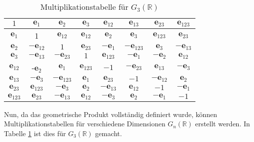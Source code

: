 \begin{table}
    \label{tab:multip}
    \begin{center}
    \begin{tabular}{ |c|ccc|ccc|c| } 
     \hline
     $1$ & $\textbf{e}_1$ & $\textbf{e}_2$ &$\textbf{e}_3$ & $\textbf{e}_{12}$ & $\textbf{e}_{13}$ & $\textbf{e}_{23}$ & $\textbf{e}_{123}$\\
     \hline
     $\textbf{e}_1$ & 1 & $\textbf{e}_{12}$ & $\textbf{e}_{12}$ & $\textbf{e}_2$ & $\textbf{e}_3$ & $\textbf{e}_{123}$ & $\textbf{e}_{23}$\\
     $\textbf{e}_2$ & $-\textbf{e}_{12}$ & $1$ & $\textbf{e}_{23}$ & $-\textbf{e}_1$ & $-\textbf{e}_{123}$ & $\textbf{e}_3$ & $-\textbf{e}_{13}$\\
     $\textbf{e}_3$ & $-\textbf{e}_{13}$ & $-\textbf{e}_{23}$ & $1$ & $\textbf{e}_{123}$ & $-\textbf{e}_1$ & $-\textbf{e}_2$ & $\textbf{e}_{12}$\\
     \hline
     $\textbf{e}_{12}$ & -$\textbf{e}_2$ & $\textbf{e}_1$& $\textbf{e}_{123}$ & $-1$ & $-\textbf{e}_{23}$ & $\textbf{e}_{13}$ &  $-\textbf{e}_{3}$\\
     $\textbf{e}_{13}$ & $-\textbf{e}_{3}$ & $-\textbf{e}_{123}$ & $\textbf{e}_{1}$ & $\textbf{e}_{23}$ & $-1$ & $-\textbf{e}_{12}$ &  $\textbf{e}_{2}$\\
     $\textbf{e}_{23}$ &  $\textbf{e}_{123}$ & $-\textbf{e}_{3}$ & $\textbf{e}_{2}$ & $-\textbf{e}_{13}$ & $\textbf{e}_{12}$ & $-1$ & $-\textbf{e}_{1}$ \\
     \hline
     $\textbf{e}_{123}$ & $\textbf{e}_{23}$ & $-\textbf{e}_{13}$ & $\textbf{e}_{12}$ & $-\textbf{e}_{3}$& $\textbf{e}_{2}$ & $-\textbf{e}_{1}$ & $-1$ \\
     \hline
    \end{tabular}
    \end{center}
 	\caption{Multiplikationstabelle für $G_3(\mathbb{R})$}
\end{table}
Nun, da das geometrische Produkt vollständig definiert wurde, können Multiplikationstabellen für verschiedene Dimensionen $G_n(\mathbb{R})$ erstellt werden. In Tabelle \ref{tab:multip} ist dies für  $G_3(\mathbb{R})$ gemacht.
